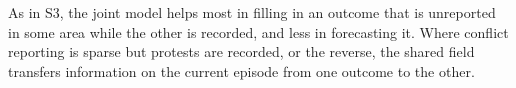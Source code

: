 As in S3, the joint model helps most in filling in an outcome that is unreported in
some area while the other is recorded, and less in forecasting it. Where conflict
reporting is sparse but protests are recorded, or the reverse, the shared field
transfers information on the current episode from one outcome to the other.
